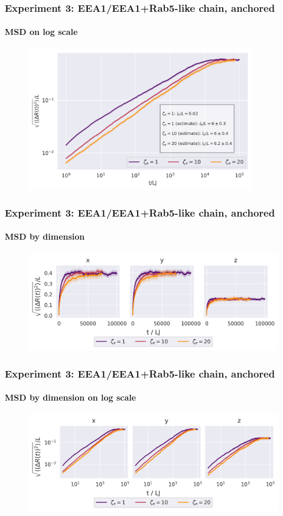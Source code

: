 \documentclass[handout]{beamer}
\begin{document}
\begin{frame}
    \frametitle{Experiment 3: EEA1/EEA1+Rab5-like chain, anchored}
    \framesubtitle{MSD on log scale}
    \begin{figure}[h]
        \includegraphics[width=10cm]{./14+15+16-exp-msd-log.png}
    \end{figure}
\end{frame}

\begin{frame}
    \frametitle{Experiment 3: EEA1/EEA1+Rab5-like chain, anchored}
    \framesubtitle{MSD by dimension}
    \begin{figure}[h]
        \includegraphics[width=11.2cm]{./14+15+16-exp-msd-dim.png}
    \end{figure}
\end{frame}

\begin{frame}
    \frametitle{Experiment 3: EEA1/EEA1+Rab5-like chain, anchored}
    \framesubtitle{MSD by dimension on log scale}
    \begin{figure}[h]
        \includegraphics[width=11.2cm]{./14+15+16-exp-msd-dim-log.png}
    \end{figure}
\end{frame}
\end{document}
